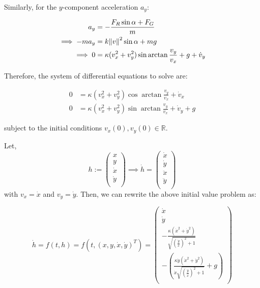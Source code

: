 \documentclass[a4paper,11pt]{article}
\numberwithin{equation}{section}
\numberwithin{figure}{section}
\begin{document}
Similarly, for the $y$-component acceleration $a_y$:

\begin{align*}
    a_y        & = -\frac{F_R \sin \alpha + F_G}{m}                                     \\
    \implies -ma_y & = k \norm{v}^2 \sin \alpha + m g                                       \\
    \implies 0     & = \kappa (v_x^2 + v_y^2) \sin \arctan \frac{v_y}{v_x} + g + \dot{v}_y
\end{align*}

Therefore, the system of differential equations to solve are:

\begin{align*}
    0 & = \kappa (v_x^2 + v_y^2) \cos \arctan \frac{v_y}{v_x} + \dot{v}_x     \\
    0 & = \kappa (v_x^2 + v_y^2) \sin \arctan \frac{v_y}{v_x} + \dot{v}_y + g
\end{align*}

subject to the initial conditions $v_x(0), v_y(0) \in \mathbb{R}$.

Let, $$h := \left(
    \begin{array}{c}
            x       \\
            y       \\
            \dot{x} \\
            \dot{y} \\
        \end{array}
    \right) \implies \dot{h} = \left(
    \begin{array}{c}
            \dot{x}  \\
            \dot{y}  \\
            \ddot{x} \\
            \ddot{y} \\
        \end{array}
    \right)$$
with $v_x = \dot{x}$ and $v_y = \dot{y}$. Then, we can rewrite the above initial value problem as:

$$
    \dot{h} = f(t,h) = f(t, (x, y, \dot{x}, \dot{y})^T) = \left( \begin{array}{c}
            \dot{x}                                                                                            \\
            \dot{y}                                                                                            \\
            -\frac{\kappa(\dot{x}^2 + \dot{y}^2)}{\sqrt{(\frac{\dot{y}}{\dot{x}})^2+1}}                        \\
            -(\frac{\kappa \dot{y} (\dot{x}^2 + \dot{y}^2)}{\dot{x} \sqrt{(\frac{\dot{y}}{\dot{x}})^2+1}} + g) \\
        \end{array} \right)
$$
\newpage
\end{document}
